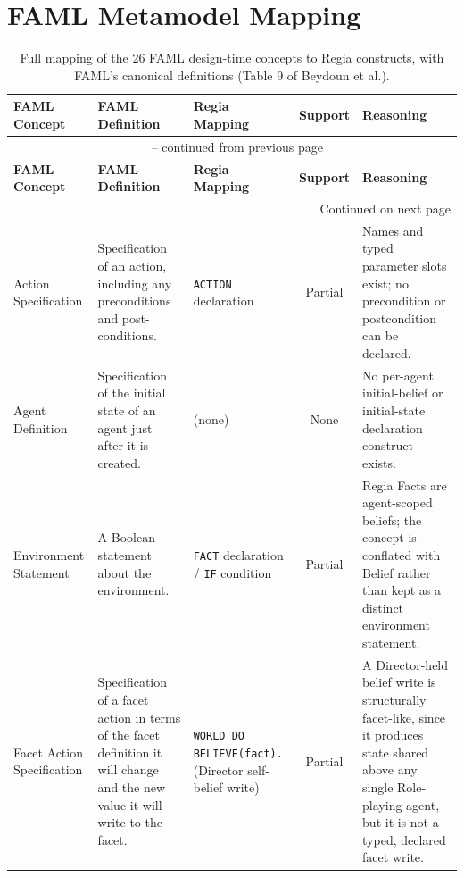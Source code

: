 \section{FAML Metamodel Mapping}
\label{app:faml-mapping}


\begin{longtable}{|p{}|p{}|p{}|c|p{}|}
\caption{Full mapping of the 26 FAML design-time concepts to Regia constructs, with FAML's canonical definitions (Table 9 of Beydoun et al.).}
\label{tab:faml-design-mapping} \\
\hline
\textbf{FAML Concept} & \textbf{FAML Definition} & \textbf{Regia Mapping} & \textbf{Support} & \textbf{Reasoning} \\
\hline
\endfirsthead
\multicolumn{5}{c}{{\tablename\ \thetable{} -- continued from previous page}} \\
\hline
\textbf{FAML Concept} & \textbf{FAML Definition} & \textbf{Regia Mapping} & \textbf{Support} & \textbf{Reasoning} \\
\hline
\endhead
\hline \multicolumn{5}{r}{{Continued on next page}} \\
\endfoot
\hline
\endlastfoot

Action Specification &
Specification of an action, including any preconditions and post-conditions. &
\lstinline|ACTION| declaration &
Partial &
Names and typed parameter slots exist; no precondition or postcondition can be declared. \\
\hline

Agent Definition &
Specification of the initial state of an agent just after it is created. &
(none) &
None &
No per-agent initial-belief or initial-state declaration construct exists. \\
\hline

Environment Statement &
A Boolean statement about the environment. &
\lstinline|FACT| declaration / \lstinline|IF| condition &
Partial &
Regia Facts are agent-scoped beliefs; the concept is conflated with Belief rather than kept as a distinct environment statement. \\
\hline

Facet Action Specification &
Specification of a facet action in terms of the facet definition it will change and the new value it will write to the facet. &
\lstinline|WORLD DO BELIEVE(fact).| (Director self-belief write) &
Partial &
A Director-held belief write is structurally facet-like, since it produces state shared above any single Role-playing agent, but it is not a typed, declared facet write. \\
\hline


\end{longtable}
